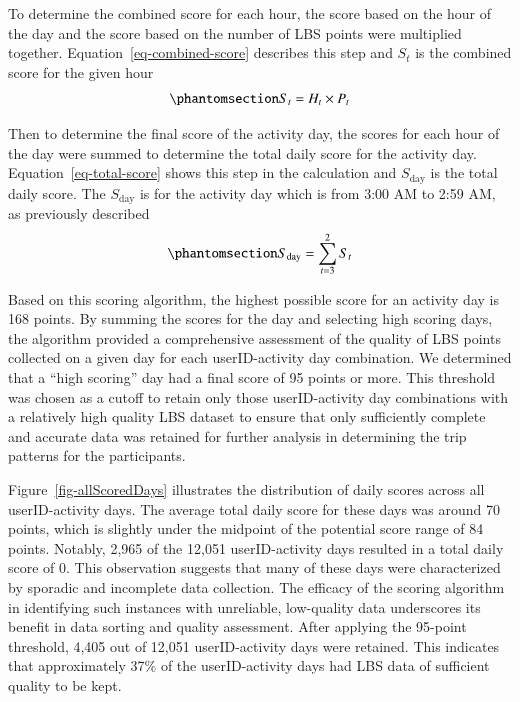 \documentclass[
  letterpaper,
  number,
  review,
  3p]{elsarticle}
\begin{document}
To determine the combined score for each hour, the score based on the
hour of the day and the score based on the number of LBS points were
multiplied together. Equation~\ref{eq-combined-score} describes this
step and \(S_t\) is the combined score for the given hour
\begin{equation}\phantomsection\label{eq-combined-score}{
S_t = H_t \times P_t
}\end{equation}

Then to determine the final score of the activity day, the scores for
each hour of the day were summed to determine the total daily score for
the activity day. \clearpage Equation~\ref{eq-total-score} shows this
step in the calculation and \(S_{\text{day}}\) is the total daily score.
The \(S_{\text{day}}\) is for the activity day which is from 3:00 AM to
2:59 AM, as previously described
\begin{equation}\phantomsection\label{eq-total-score}{
S_{\text{day}} = \sum_{t=3}^{2} S_t
}\end{equation}

Based on this scoring algorithm, the highest possible score for an
activity day is 168 points. By summing the scores for the day and
selecting high scoring days, the algorithm provided a comprehensive
assessment of the quality of LBS points collected on a given day for
each userID-activity day combination. We determined that a ``high
scoring'' day had a final score of 95 points or more. This threshold was
chosen as a cutoff to retain only those userID-activity day combinations
with a relatively high quality LBS dataset to ensure that only
sufficiently complete and accurate data was retained for further
analysis in determining the trip patterns for the participants.

Figure~\ref{fig-allScoredDays} illustrates the distribution of daily
scores across all userID-activity days. The average total daily score
for these days was around 70 points, which is slightly under the
midpoint of the potential score range of 84 points. Notably, 2,965 of
the 12,051 userID-activity days resulted in a total daily score of 0.
This observation suggests that many of these days were characterized by
sporadic and incomplete data collection. The efficacy of the scoring
algorithm in identifying such instances with unreliable, low-quality
data underscores its benefit in data sorting and quality assessment.
After applying the 95-point threshold, 4,405 out of 12,051
userID-activity days were retained. This indicates that approximately
37\% of the userID-activity days had LBS data of sufficient quality to
be kept.
\end{document}
